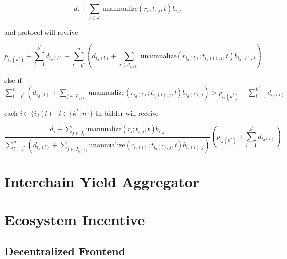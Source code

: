 \documentclass[dvipdfmx]{jsarticle}
\begin{document}
$$
  d_i + \sum_{j \in J_i} \text{unannualize}(r_i, t_{i,j}, t) b_{i,j}
$$

and protocol will reveive

$$
  p_{i_d(k^*)} + \sum_{l=1}^{k^*} d_{i_d(l)} - \sum_{l=k^*}^n \left(d_{i_d(l)} + \sum_{j \in J_{i_d(l)}} \text{unannualize}(r_{i_d(l)}; t_{i_d(l),j}, t) b_{i_d(l),j} \right)
$$

else if $\sum_{l=k^*}^n \left(d_{i_d(l)} + \sum_{j \in J_{i_d(l)}} \text{unannualize}(r_{i_d(l)}; t_{i_d(l),j}, t) b_{i_d(l),j} \right) > p_{i_d(k^*)} + \sum_{l=1}^{k^*} d_{i_d(l)}$

each $i \in \{i_d(l) \mid l \in \{k^*:n\}\}$ th bidder will receive

$$
  \frac{d_i + \sum_{j \in J_i} \text{unannualize}(r_i; t_{i,j}, t) b_{i,j}}{\sum_{l=k^*}^n \left(d_{i_d(l)} + \sum_{j \in J_{i_d(l)}} \text{unannualize}(r_{i_d(l)}; t_{i_d(l),j}, t) b_{i_d(l),j} \right)} \left( p_{i_d(k^*)} + \sum_{l=1}^{k^*} d_{i_d(l)} \right)
$$

\section{Interchain Yield Aggregator}

\section{Ecosystem Incentive}

\subsection{Decentralized Frontend}
\end{document}
